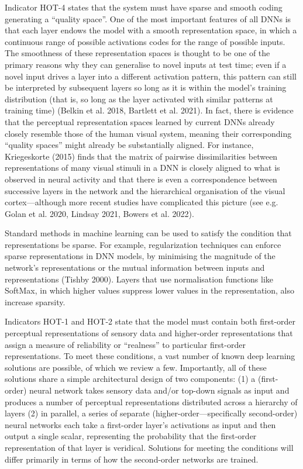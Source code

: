 \documentclass[12pt]{article}
\begin{document}
Indicator HOT-4 states that the system must have sparse and smooth coding generating a ``quality space''. One of the most important features of all DNNs is that each layer endows the model with a smooth representation space, in which a continuous range of possible activations codes for the range of possible inputs. The smoothness of these representation spaces is thought to be one of the primary reasons why they can generalise to novel inputs at test time; even if a novel input drives a layer into a different activation pattern, this pattern can still be interpreted by subsequent layers so long as it is within the model’s training distribution (that is, so long as the layer activated with similar patterns at training time) (Belkin et al. 2018, Bartlett et al. 2021). In fact, there is evidence that the perceptual representation spaces learned by current DNNs already closely resemble those of the human visual system, meaning their corresponding ``quality spaces'' might already be substantially aligned. For instance, Kriegeskorte (2015) finds that the matrix of pairwise dissimilarities between representations of many visual stimuli in a DNN is closely aligned to what is observed in neural activity and that there is even a correspondence between successive layers in the network and the hierarchical organisation of the visual cortex—although more recent studies have complicated this picture (see e.g. Golan et al. 2020, Lindsay 2021, Bowers et al. 2022).

Standard methods in machine learning can be used to satisfy the condition that representations be sparse. For example, regularization techniques can enforce sparse representations in DNN models, by minimising the magnitude of the network’s representations or the mutual information between inputs and representations (Tishby 2000). Layers that use normalisation functions like SoftMax, in which higher values suppress lower values in the representation, also increase sparsity.

Indicators HOT-1 and HOT-2 state that the model must contain both first-order perceptual representations of sensory data and higher-order representations that assign a measure of reliability or ``realness'' to particular first-order representations. To meet these conditions, a vast number of known deep learning solutions are possible, of which we review a few. Importantly, all of these solutions share a simple architectural design of two components: (1) a (first-order) neural network takes sensory data and/or top-down signals as input and produces a number of perceptual representations distributed across a hierarchy of layers (2) in parallel, a series of separate (higher-order—specifically second-order) neural networks each take a first-order layer’s activations as input and then output a single scalar, representing the probability that the first-order representation of that layer is veridical. Solutions for meeting the conditions will differ primarily in terms of how the second-order networks are trained.
\end{document}
